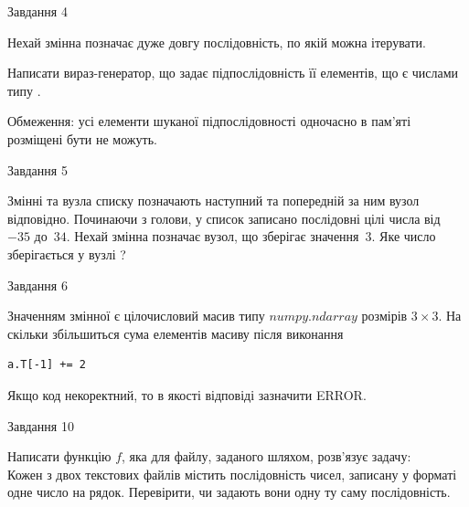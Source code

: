\documentclass[12pt, ukrainian]{article}
\begin{document}
{\begin{minipage}[t]{8.0cm}
\end{minipage}


               
{\begin{center}Завдання {4}\end{center}}
\vspace{-4mm}
Нехай змінна  позначає дуже довгу послідовність, по якій можна ітерувати.

Написати вираз-генератор, що задає підпослідовність її елементів, що є числами типу .

Обмеження: усі елементи шуканої підпослідовності одночасно в пам'яті розміщені бути не можуть.\par

\vspace{10mm}
               
{\begin{center}Завдання {5}\end{center}}
\vspace{-4mm}
Змінні  та  вузла списку позначають наступний та попередній за ним вузол відповідно. Починаючи з голови, у список записано послідовні цілі числа від~$-35$ до~$34$. Нехай змінна  позначає вузол, що зберігає значення~$3$.
Яке число зберігається у вузлі  ?\par

               
{\begin{center}Завдання {6}\end{center}}
\vspace{-4mm}
Значенням змінної  є цілочисловий масив типу $numpy.ndarray$ розмірів $3{\times}3$. На скільки збільшиться сума елементів масиву  після виконання
\begin{verbatim}
a.T[-1] += 2
\end{verbatim}


Якщо код некоректний, то в якості відповіді зазначити ERROR.\par

               
{\begin{center}Завдання {10}\end{center}}
\vspace{-4mm}

Написати функцію $f$, яка для файлу, заданого шляхом, розв’язує задачу:\\ Кожен з двох текстових файлів містить послідовність чисел, записану у форматі одне число на рядок.  Перевірити, чи задають вони одну ту саму послідовність.

}
\end{document}
